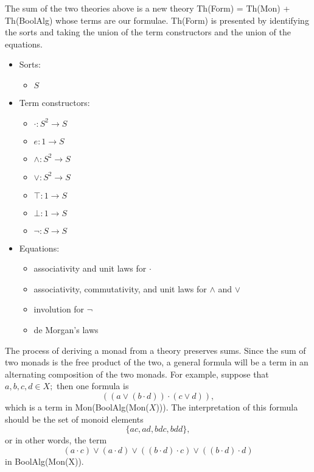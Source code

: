 \documentclass{llncs}
\newcommand{\maps}{\colon}
\begin{document}
The sum of the two theories above is a new theory Th(Form) = Th(Mon) + Th(BoolAlg) whose terms are our formulae.  Th(Form) is presented by identifying the sorts and taking the union of the term constructors and the union of the equations.
\begin{center}
  \begin{itemize}
    \item Sorts:
    \begin{itemize}
      \item $S$
    \end{itemize}
    \item Term constructors:
    \begin{itemize}
      \item $\cdot\maps S^2 \to S$
      \item $e\maps 1 \to S$
      \item $\land\maps S^2 \to S$
      \item $\lor\maps S^2 \to S$
      \item $\top\maps 1 \to S$
      \item $\bot\maps 1 \to S$
      \item $\neg\maps S \to S$
    \end{itemize}
    \item Equations:
    \begin{itemize}
      \item associativity and unit laws for $\cdot$
      \item associativity, commutativity, and unit laws for $\land$ and $\lor$
      \item involution for $\neg$
      \item de Morgan's laws
    \end{itemize}
  \end{itemize}
\end{center}
The process of deriving a monad from a theory preserves sums.  Since the sum of two monads is the free product of the two, a general formula will be a term in an alternating composition of the two monads.  For example, suppose that $a, b, c, d \in X;$ then one formula is
\[ (({a}\lor{(b \cdot d)}) \cdot ({c}\lor{d})), \]
which is a term in Mon(BoolAlg(Mon($X$))).  The interpretation of this formula should be the set of monoid elements
\[ \{ ac, ad, bdc, bdd \}, \]
or in other words, the term
\[ (a \cdot c) \lor (a \cdot d) \lor ((b \cdot d) \cdot c) \lor ((b \cdot d) \cdot d) \]
in BoolAlg(Mon(X)).
\end{document}
